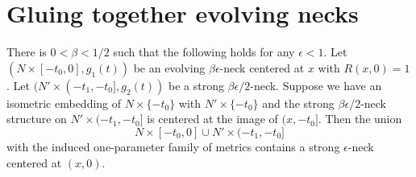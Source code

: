 \section{Gluing together evolving necks}



\begin{proposition}
\label{prop:neck-gluing}
\label{neckglue}
There is $0<\beta<1/2$ such that the following holds for any
$\epsilon<1$. Let $(N\times [-t_0,0],g_1(t))$ be an evolving
$\beta\epsilon$-neck centered at $x$ with $R(x,0)=1$. Let $
(N'\times (-t_1,-t_0],g_2(t))$ be a strong $\beta\epsilon/2$-neck.
Suppose we have an isometric embedding of $N\times \{-t_0\}$ with
$N'\times \{-t_0\}$ and the strong $\beta\epsilon/2$-neck structure on $N'\times
(-t_1,-t_0]$ is centered at the image of $(x,-t_0]$. Then the union
$$N\times [-t_0,0]\cup N'\times (-t_1,-t_0]$$ with the induced
one-parameter family of metrics contains a strong $\epsilon$-neck
centered at $(x,0)$.
\end{proposition}


